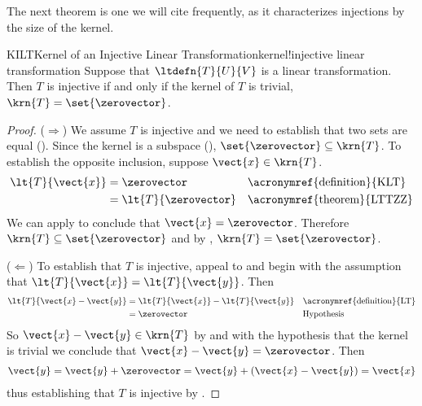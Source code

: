 %
The next theorem is one we will cite frequently, as it characterizes injections by the size of the kernel.
%
\begin{theorem}{KILT}{Kernel of an Injective Linear Transformation}{kernel!injective linear transformation}
Suppose that $\ltdefn{T}{U}{V}$ is a linear transformation.  Then $T$ is injective if and only if the kernel of $T$ is trivial, $\krn{T}=\set{\zerovector}$.
\end{theorem}
%
\begin{proof}
($\Rightarrow$) We assume $T$ is injective and we need to establish that two sets are equal ().  Since the kernel is a subspace (), $\set{\zerovector}\subseteq\krn{T}$.  To establish the opposite inclusion, suppose $\vect{x}\in\krn{T}$.
%
\begin{align*}
\lt{T}{\vect{x}}
&=\zerovector&&\text{\acronymref{definition}{KLT}}\\
%
&=\lt{T}{\zerovector}
&&\text{\acronymref{theorem}{LTTZZ}}
%
\end{align*}
%
We can apply  to conclude that $\vect{x}=\zerovector$.  Therefore $\krn{T}\subseteq\set{\zerovector}$ and by , $\krn{T}=\set{\zerovector}$.\par
%
($\Leftarrow$)  To establish that $T$ is injective, appeal to  and begin with the assumption that $\lt{T}{\vect{x}}=\lt{T}{\vect{y}}$.  Then
%
\begin{align*}
\lt{T}{\vect{x}-\vect{y}}
&=\lt{T}{\vect{x}}-\lt{T}{\vect{y}}
&&\text{\acronymref{definition}{LT}}\\
%
&=\zerovector
&&\text{Hypothesis}
%
\end{align*}
%
So $\vect{x}-\vect{y}\in\krn{T}$ by  and with the hypothesis that the kernel is trivial we conclude that $\vect{x}-\vect{y}=\zerovector$.  Then
%
\begin{align*}
\vect{y}
=\vect{y}+\zerovector
=\vect{y}+\left(\vect{x}-\vect{y}\right)
=\vect{x}
\end{align*}
%
thus establishing that $T$ is injective by .
%
\end{proof}
%
